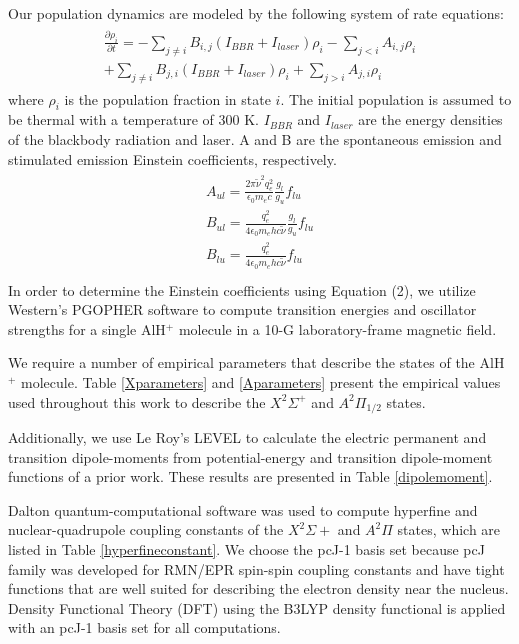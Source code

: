 \documentclass[nofootinbib,aip,jcp,reprint]{revtex4-1}
\begin{document}
Our population dynamics are modeled by the following system of rate equations:
\begin{align}
\begin{aligned}
\frac{\partial\rho_i}{\partial t}=-\sum_{j\neq i}B_{i,j}(I_{BBR}+I_{laser})\rho_i - \sum_{j<i}A_{i,j}\rho_i \\
+\sum_{j\neq i}B_{j,i}(I_{BBR}+I_{laser})\rho_i + \sum_{j>i}A_{j,i}\rho_i 
\end{aligned}
\end{align}
where $\rho_i$ is the population fraction in state $i$. The initial population is assumed to be thermal with a temperature of 300 K. $I_{BBR}$ and $I_{laser}$ are the energy densities of the blackbody radiation and laser. A and B are the spontaneous emission and stimulated emission Einstein coefficients, respectively.
\begin{align}
\begin{aligned}
A_{ul} = \frac{2\pi \widetilde{\nu}^2 q_e^2}{\epsilon_0 m_e c} \frac{g_l}{g_u} f_{lu}\\
B_{ul} = \frac{q_e^2}{4 \epsilon_0 m_e h c \widetilde{\nu}} \frac{g_l}{g_u} f_{lu} \\
B_{lu} = \frac{q_e^2}{4 \epsilon_0 m_e h c \widetilde{\nu}} f_{lu}\\
\end{aligned}
\end{align}
In order to determine the Einstein coefficients using Equation (2), we utilize Western's PGOPHER\cite{western2017pgopher} software to compute transition energies and oscillator strengths for a single AlH$^+$ molecule in a 10-G laboratory-frame magnetic field. 

We require a number of empirical parameters that describe the states of the AlH$^+$ molecule. Table \ref{Xparameters} and \ref{Aparameters} present the empirical values used throughout this work to describe the $X^2 \Sigma^{+}$  and $A^2\Pi_{1/2}$ states.

Additionally, we use Le Roy's LEVEL\cite{le2017level} to calculate the electric permanent and transition dipole-moments from potential-energy and transition dipole-moment functions of a prior work\cite{nguyen2011challenges}. These results are presented in Table \ref{dipolemoment}.

Dalton\cite{daltonpaper, daltonwebpage} quantum-computational software was used to compute hyperfine and nuclear-quadrupole coupling constants of the $X^2\Sigma+$ and $A^2\Pi$ states, which are listed in Table \ref{hyperfineconstant}. We choose the pcJ-1 basis set because pcJ family was developed for RMN/EPR spin-spin coupling constants and have tight functions that are well suited for describing the electron density near the nucleus. Density Functional Theory (DFT) using the B3LYP density functional is applied with an pcJ-1 basis set for all computations.
\end{document}
